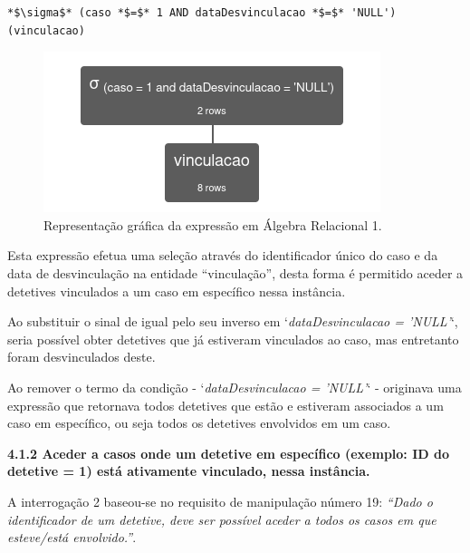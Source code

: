 \documentclass[a4paper,12pt]{scrreprt}
\begin{document}
\vspace{0.2cm}

\begin{lstlisting}[escapechar=*]
*$\sigma$* (caso *$=$* 1 AND dataDesvinculacao *$=$* 'NULL') (vinculacao)
\end{lstlisting}

\begin{figure}[!ht]
    \centering
    \includegraphics[scale=0.9]{images/relax/1.png}
    \caption{Representação gráfica da expressão em Álgebra Relacional 1.}
 \end{figure}
\vspace{0.2cm}

Esta expressão efetua uma seleção através do identificador único do caso e da data de desvinculação na entidade “vinculação”, desta forma é permitido aceder a detetives vinculados a um caso em específico nessa instância.

Ao substituir o sinal de igual pelo seu inverso em `\textit{dataDesvinculacao = 'NULL'}`, seria possível obter detetives que já estiveram vinculados ao caso, mas entretanto foram desvinculados deste.

Ao remover o termo da condição - `\textit{dataDesvinculacao = 'NULL'}` - originava uma expressão que retornava todos detetives que estão e estiveram associados a um caso em específico, ou seja todos os detetives envolvidos em um caso.

\clearpage %
{\large\textbf{4.1.2 Aceder a casos onde um detetive em específico (exemplo: ID do detetive = 1) está ativamente vinculado, nessa instância.}}

\vspace{0.2cm}

A interrogação 2 baseou-se no requisito de manipulação número 19: \textit{“Dado o identificador de um detetive, deve ser possível aceder a todos os casos em que esteve/está envolvido.”}.

\vspace{0.2cm}
\end{document}

